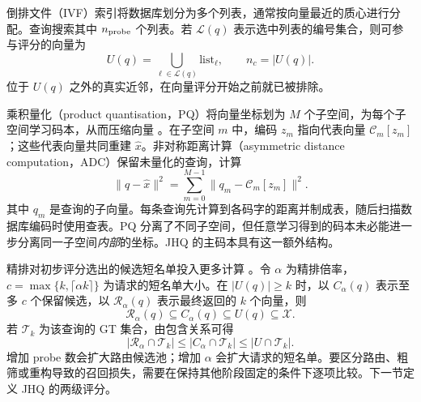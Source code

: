 倒排文件（IVF）索引将数据库划分为多个列表，通常按向量最近的质心进行分配。查询搜索其中 $n_{\rm probe}$ 个列表。若 $\mathcal L(q)$ 表示选中列表的编号集合，则可参与评分的向量为
\[
 U(q)=\bigcup_{\ell\in\mathcal L(q)}\mathrm{list}_\ell,\qquad n_c=|U(q)|.
\]
位于 $U(q)$ 之外的真实近邻，在向量评分开始之前就已被排除。

乘积量化（product quantisation，PQ）将向量坐标划为 $M$ 个子空间，为每个子空间学习码本，从而压缩向量 \cite{pq}。在子空间 $m$ 中，编码 $z_m$ 指向代表向量 $\mathcal C_m[z_m]$；这些代表向量共同重建 $\widehat x$。非对称距离计算（asymmetric distance computation，ADC）保留未量化的查询，计算
\begin{equation}
 \|q-\widehat x\|^2=\sum_{m=0}^{M-1}\|q_m-\mathcal C_m[z_m]\|^2.
 \label{eq:2-adc}
\end{equation}
其中 $q_m$ 是查询的子向量。每条查询先计算到各码字的距离并制成表，随后扫描数据库编码时使用查表。PQ 分离了不同子空间，但任意学习得到的码本未必能进一步分离同一子空间\emph{内部}的坐标。JHQ 的主码本具有这一额外结构。

精排对初步评分选出的候选短名单投入更多计算 \cite{johnson_gpu,faiss_refine}。令 $\alpha$ 为精排倍率，$c=\max\{k,\lceil\alpha k\rceil\}$ 为请求的短名单大小。在 $|U(q)|\geq k$ 时，以 $C_\alpha(q)$ 表示至多 $c$ 个保留候选，以 $\mathcal R_\alpha(q)$ 表示最终返回的 $k$ 个向量，则
\begin{equation}
 \mathcal R_\alpha(q)\subseteq C_\alpha(q)\subseteq U(q)\subseteq\mathcal X.
 \label{eq:2-cascade}
\end{equation}
若 $\mathcal T_k$ 为该查询的 GT 集合，由包含关系可得
\[
 |\mathcal R_\alpha\cap\mathcal T_k|
 \leq |C_\alpha\cap\mathcal T_k|
 \leq |U\cap\mathcal T_k|.
\]
增加 probe 数会扩大路由候选池；增加 $\alpha$ 会扩大请求的短名单。要区分路由、粗筛或重构导致的召回损失，需要在保持其他阶段固定的条件下逐项比较。下一节定义 JHQ 的两级评分。
